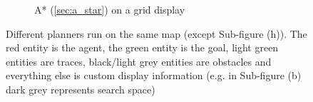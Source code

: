 \begin{figure}[h]
\begin{subfigure}[b]{0.2\linewidth}
    \caption{A* (\ref{sec:a_star}) on a grid display}
  \end{subfigure}
  \caption{Different planners run on the same map (except Sub-figure (h)). The red entity is the agent, the green entity is the goal, light green entities are traces, black/light grey entities are obstacles and everything else is custom display information (e.g. in Sub-figure (b) dark grey represents search space)}
  \label{fig: sim}
\end{figure}

\pagebreak



